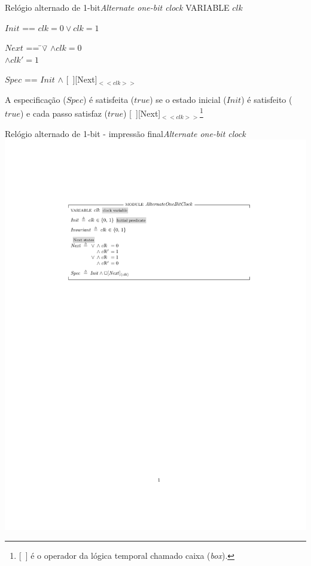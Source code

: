 \begin{frame}{Relógio alternado de 1-bit}{\em Alternate one-bit clock}
  VARIABLE $clk$  

  \pause

  \bigskip
   $Init$ == $clk = 0 \lor clk=1$ \\

  \pause
  \bigskip\begingroup

    \hfill
    \begin{tabbing}
      $Next$ == \=$\lor$\= $\land clk = 0$\\
      \>\>$\land clk' = 1$\\
    \end{tabbing}

\endgroup

\pause\bigskip

$Spec$ == $Init$ $\land$ [\ ][Next]$_{<<clk>>}$ 

\pause\medskip

{\scriptsize\color{blue} A especificação ($Spec$) é satisfeita ($true$) se o
  estado inicial ($Init$) é satisfeito ($true$) e cada passo satisfaz
  ($true$) [\ ][Next]$_{<<clk>>}$\footnote{\tiny [\ ] é o operador da lógica temporal
   chamado caixa ({\em box}).}}

\end{frame}

\begin{frame}[fragile]{Relógio alternado de 1-bit - impressão final}{\em Alternate one-bit clock}
  \includegraphics[scale=.6]{../src/aobc/AlternateOneBitClock.pdf}
\end{frame}


